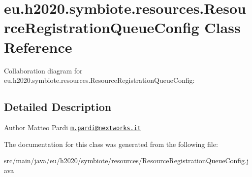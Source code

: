 \hypertarget{classeu_1_1h2020_1_1symbiote_1_1resources_1_1ResourceRegistrationQueueConfig}{}\section{eu.\+h2020.\+symbiote.\+resources.\+Resource\+Registration\+Queue\+Config Class Reference}
\label{classeu_1_1h2020_1_1symbiote_1_1resources_1_1ResourceRegistrationQueueConfig}


Collaboration diagram for eu.\+h2020.\+symbiote.\+resources.\+Resource\+Registration\+Queue\+Config\+:


\subsection{Detailed Description}
\begin{DoxyAuthor}{Author}
Matteo Pardi \href{mailto:m.pardi@nextworks.it}{\tt m.\+pardi@nextworks.\+it} 
\end{DoxyAuthor}


The documentation for this class was generated from the following file\+:\begin{DoxyCompactItemize}
\item 
src/main/java/eu/h2020/symbiote/resources/Resource\+Registration\+Queue\+Config.\+java\end{DoxyCompactItemize}
